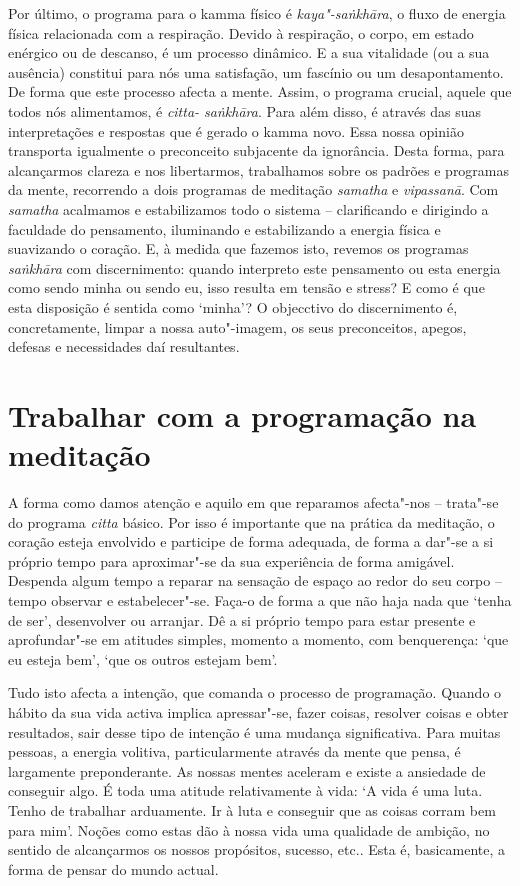 \enlargethispage{\baselineskip}

Por último, o programa para o kamma físico é \emph{kaya"-saṅkhāra}, o fluxo de
energia física relacionada com a respiração. Devido à respiração, o corpo, em
estado enérgico ou de descanso, é um processo dinâmico. E a sua vitalidade (ou a
sua ausência) constitui para nós uma satisfação, um fascínio ou um
desapontamento. De forma que este processo afecta a mente. Assim, o programa
crucial, aquele que todos nós alimentamos, é \emph{citta- saṅkhāra}. Para além
disso, é através das suas interpretações e respostas que é gerado o kamma novo.
Essa nossa opinião transporta igualmente o preconceito subjacente da ignorância.
Desta forma, para alcançarmos clareza e nos libertarmos, trabalhamos sobre os
padrões e programas da mente, recorrendo a dois programas de meditação
\emph{samatha} e \emph{vipassanā}. Com \emph{samatha} acalmamos e estabilizamos
todo o sistema -- clarificando e dirigindo a faculdade do pensamento, iluminando
e estabilizando a energia física e suavizando o coração. E, à medida que fazemos
isto, revemos os programas \emph{saṅkhāra} com discernimento: quando interpreto
este pensamento ou esta energia como sendo minha ou sendo eu, isso resulta em
tensão e stress? E como é que esta disposição é sentida como `minha'? O
objecctivo do discernimento é, concretamente, limpar a nossa auto"-imagem, os
seus preconceitos, apegos, defesas e necessidades daí resultantes.

\section{Trabalhar com a programação na meditação}

A forma como damos atenção e aquilo em que reparamos afecta"-nos -- trata"-se do
programa \emph{citta} básico. Por isso é importante que na prática da meditação,
o coração esteja envolvido e participe de forma adequada, de forma a dar"-se a si
próprio tempo para aproximar"-se da sua experiência de forma amigável. Despenda
algum tempo a reparar na sensação de espaço ao redor do seu corpo -- tempo
observar e estabelecer"-se. Faça-o de forma a que não haja nada que `tenha de
ser', desenvolver ou arranjar. Dê a si próprio tempo para estar presente e
aprofundar"-se em atitudes simples, momento a momento, com benquerença: `que eu
esteja bem', `que os outros estejam bem'.

Tudo isto afecta a intenção, que comanda o processo de programação. Quando o
hábito da sua vida activa implica apressar"-se, fazer coisas, resolver coisas e
obter resultados, sair desse tipo de intenção é uma mudança significativa. Para
muitas pessoas, a energia volitiva, particularmente através da mente que pensa,
é largamente preponderante. As nossas mentes aceleram e existe a ansiedade de
conseguir algo. É toda uma atitude relativamente à vida: `A vida é uma luta.
Tenho de trabalhar arduamente. Ir à luta e conseguir que as coisas corram bem
para mim'. Noções como estas dão à nossa vida uma qualidade de ambição, no
sentido de alcançarmos os nossos propósitos, sucesso, etc.. Esta é, basicamente,
a forma de pensar do mundo actual.

